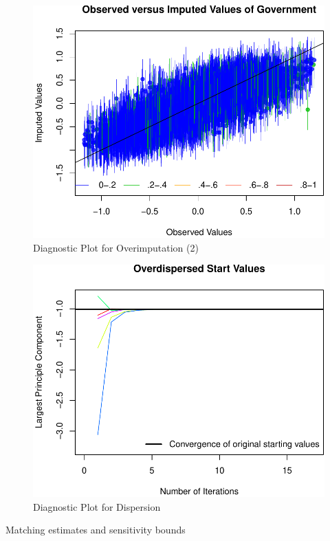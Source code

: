 \documentclass[12pt,]{article}
\begin{document}
\begin{figure}[htbp]
\centering
\includegraphics{figures/missing5-1.pdf}
\caption{Diagnostic Plot for Overimputation (2)}
\end{figure}

\clearpage

\begin{figure}[htbp]
\centering
\includegraphics{figures/missing6-1.pdf}
\caption{Diagnostic Plot for Dispersion}
\end{figure}

Matching estimates and sensitivity bounds
\end{document}
